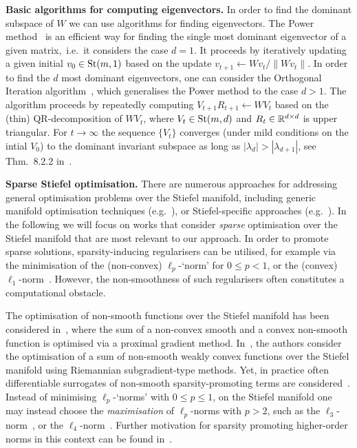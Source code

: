 \documentclass{article}
\begin{document}
\textbf{Basic algorithms for computing eigenvectors.} In order to find the dominant subspace of $W$
%
we can use algorithms for finding eigenvectors. The Power method~\cite{golub2013matrix} is an efficient way for finding the single most dominant eigenvector of a given matrix,~i.e.~it considers the case $d=1$. It proceeds by iteratively updating a given initial $v_0 \in \operatorname{St}(m,1)$ based on the update $v_{t+1} \gets Wv_t/\|W v_t\|$. In order to find the $d$ most dominant eigenvectors, one can consider the Orthogonal Iteration algorithm~\cite{golub2013matrix}, which generalises the Power method to the case $d>1$.
%
The algorithm proceeds by repeatedly computing $V_{t+1}R_{t+1} \gets W V_{t}$ based on the (thin) QR-decomposition of $W V_{t}$, where $V_t \in \operatorname{St}(m,d)$ and $R_t \in \mathbb{R}^{d \times d}$ is upper triangular. For $t \rightarrow \infty$
%
the sequence $\{V_{t}\}$ converges (under mild conditions on the intial $V_0$) to the dominant invariant subspace as long as $|\lambda_d| > |\lambda_{d+1}|$, see Thm.~8.2.2 in~\cite{golub2013matrix}.

%

%

\textbf{Sparse Stiefel optimisation.}
There are numerous approaches for addressing general optimisation problems over the Stiefel manifold, including generic manifold optimisation techniques (e.g.~\cite{absil2009optimization,manopt}), or Stiefel-specific approaches (e.g.~\cite{manton2002optimization,wen2013feasible}). In the following we will focus on works that consider \emph{sparse} optimisation over the Stiefel manifold that are most relevant to our approach.
%
In order to promote sparse solutions, sparsity-inducing regularisers can be utilised, for example via the minimisation of the (non-convex) $\ell_p$-`norm' for $0 \leq p < 1$, or the (convex) $\ell_1$-norm~\cite{qu2016finding}. However, the non-smoothness of such regularisers often constitutes a computational obstacle. 
%
%
 
The optimisation of non-smooth functions over the Stiefel manifold has been considered in~\cite{chen2020proximal}, where the sum of a non-convex smooth and a convex non-smooth function is optimised via a proximal gradient method. In~\cite{li2021weakly}, the authors consider the optimisation of a sum of non-smooth weakly convex functions over the Stiefel manifold using Riemannian subgradient-type methods. Yet, in practice often differentiable surrogates of non-smooth sparsity-promoting terms are considered~\cite{song2015sparse,lu2016convex,qu2020finding,breloy2021majorization}.
%
Instead of minimising $\ell_p$-`norms' with $0 \leq p \leq 1$, on the Stiefel manifold one may instead choose the \emph{maximisation} of $\ell_p$-norms with $p>2$, such as the %
$\ell_3$-norm~\cite{xue2020blind}, or the $\ell_4$-norm~\cite{zhai2020complete}. Further motivation for sparsity promoting higher-order norms in this context can be found in~\cite{qu2019geometric,zhang2019structured,li2018global}. 
\end{document}
